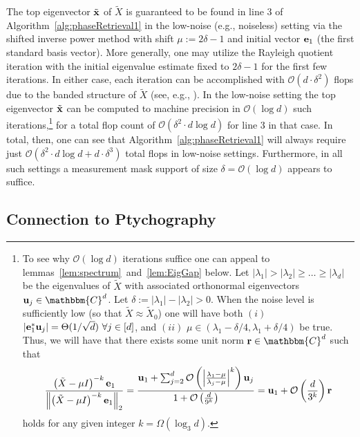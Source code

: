 The top eigenvector $\tilde{\mathbf x}$ of $\tilde{X}$ is guaranteed to be found in line 3 of Algorithm~\ref{alg:phaseRetrieval1} in the low-noise (e.g., noiseless) setting via the shifted inverse power method with shift $\mu := 2 \delta - 1$ and initial vector ${\bf e}_1$ (the first standard basis vector).  
More generally, one may utilize the Rayleigh quotient iteration with the initial eigenvalue estimate fixed to $2 \delta - 1$ for the first few iterations.
In either case, each iteration can be accomplished with $\mathcal{O}(d \cdot \delta^2)$ flops due to the banded structure of $\tilde{X}$ (see, e.g., \cite{trefethen1997numerical}).  In the low-noise setting the top eigenvector $\tilde{\mathbf x}$ can be computed to machine precision in $\mathcal{O}(\log d)$ such iterations,\footnote{To see why $\mathcal{O}(\log d)$ iterations suffice one can appeal to lemmas~\ref{lem:spectrum}~and~\ref{lem:EigGap} below.  Let $|\lambda_1| > |\lambda_2| \geq \dots \geq |\lambda_d|$ be the eigenvalues of $\tilde{X}$ with associated orthonormal eigenvectors ${\bf u}_j \in \mathbbm{C}^d$.  Let $\delta := |\lambda_1| - |\lambda_2| > 0$.  When the noise level is sufficiently low (so that $\tilde{X} \approx \tilde{X}_0$) one will have both $(i)$ $|{\bf e}^*_1 {\bf u}_j| = \Theta(1/\sqrt{d})~\forall j \in [d]$, and $(ii)$ $\mu \in (\lambda_1-\delta/4, \lambda_1+\delta/4)$ be true.  Thus, we will have that there exists some unit norm ${\bf r} \in \mathbbm{C}^d$ such that
$$\frac{\left( \tilde{X} - \mu I \right)^{-k}{\bf e}_1}{\left\| \left( \tilde{X} - \mu I \right)^{-k}{\bf e}_1 \right\|_2} = \frac{{\bf u}_1 + \sum^d_{j=2} \mathcal{O}\left( \left|\frac{\lambda_1 - \mu}{\lambda_j - \mu} \right|^k \right) {\bf u}_j}{1 + \mathcal{O}\left( \frac{d}{9^k} \right)} = {\bf u}_1 + \mathcal{O} \left( \frac{d}{3^k} \right) {\bf r}$$ holds for any given integer $k = \Omega \left( \log_3 d \right)$.} 
for a total flop count of $\mathcal{O}(\delta^2 \cdot d \log d)$ for line 3 in that case.  In total, then, one can see that Algorithm~\ref{alg:phaseRetrieval1} will always require just $\mathcal{O}(\delta^2 \cdot d \log d + d \cdot \delta^3)$ total flops in low-noise settings.  Furthermore, in all such settings a measurement mask support of size $\delta = \mathcal{O}(\log d)$ appears to suffice.

\subsection{Connection to Ptychography}
\label{sec:conn_pty}

